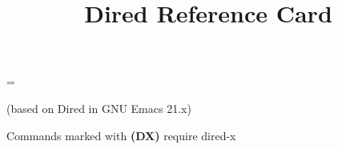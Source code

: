 \def\key#1#2{\leavevmode\hbox to \hsize{\vtop
  {\hsize=.75\hsize\rightskip=1em
  \hskip\keyindent\relax#1}\kbd{#2}\hfil}}

\newbox\metaxbox
\setbox\metaxbox\hbox{}
\newdimen\metaxwidth
\metaxwidth=\wd\metaxbox

\def\metax#1#2{\leavevmode\hbox to \hsize{\hbox to .75\hsize
  {\hskip\keyindent\relax#1\hfil}%
  \hskip -\metaxwidth minus 1fil
  \kbd{#2}\hfil}}

\def\threecol#1#2#3{\hskip\keyindent\relax#1\hfil&\kbd{#2}\hfil\quad
  &\kbd{#3}\hfil\quad\cr}

\def\dx{{\bf (DX)}}

\nopagenumbers



\title{Dired Reference Card}

\centerline{(based on Dired in GNU Emacs 21.x)}
\centerline{Commands marked with \dx{} require dired-x}




